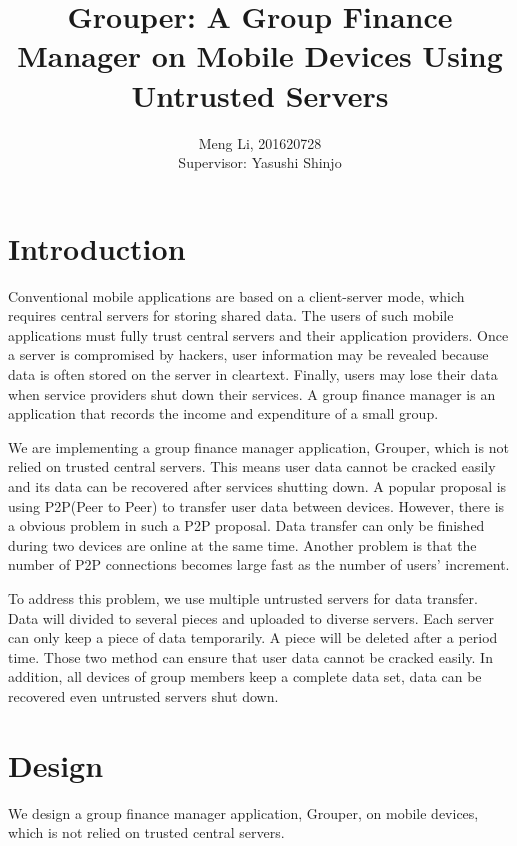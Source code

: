 \documentclass[twocolumn,10pt]{article}
\begin{document}
\date{}

\title{\bf Grouper: A Group Finance Manager on Mobile Devices Using Untrusted Servers}

\author{
	Meng Li, 201620728  
	\\ Supervisor: Yasushi Shinjo
}

\maketitle

\section{Introduction}
Conventional mobile applications are based on a client-server mode, which requires central servers for storing shared data. The users of such mobile applications must fully trust central servers and their application providers. Once a server is compromised by hackers, user information may be revealed because data is often stored on the server in cleartext. Finally, users may lose their data when service providers shut down their services. A group finance manager is an application that records the income and expenditure of a small group.

We are implementing a group finance manager application, Grouper, which is not relied on trusted central servers. This means user data cannot be cracked easily and its data can be recovered after services shutting down. A popular proposal is using P2P(Peer to Peer) to transfer user data between devices. However, there is a obvious problem in such a P2P proposal. Data transfer can only be finished during two devices are online at the same time. Another problem is that the number of P2P connections becomes large  fast as the number of users' increment. 

To address this problem, we use multiple untrusted servers for data transfer. Data will divided to several pieces and uploaded to diverse servers. Each server can only keep a piece of data temporarily. A piece will be deleted after a period time. Those two method can ensure that user data cannot be cracked easily. In addition, all devices of group members keep a complete data set, data can be recovered even untrusted servers shut down.

\section{Design}

We design a group finance manager application, Grouper, on mobile devices, which is not relied on trusted central servers. 
\end{document}
